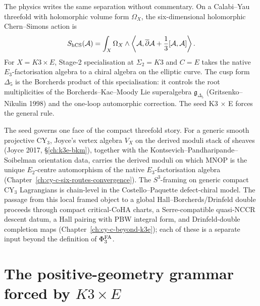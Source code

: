 The physics writes the same separation without commentary. On a
Calabi--Yau threefold with holomorphic volume form \(\Omega_X\), the
six-dimensional holomorphic Chern--Simons action is
\[
S_{\mathrm{hCS}}(\mathcal A)
=
\int_X\Omega_X\wedge
\left\langle
\mathcal A,\overline\partial\mathcal A
+\frac13[\mathcal A,\mathcal A]
\right\rangle .
\]
For \(X=K3\times E\), Stage-2 specialisation at $\Sigma_2 = K3$ and
$C = E$ takes the native \(E_3\)-factorisation algebra to a chiral
algebra on the elliptic curve. The cusp form \(\Delta_5\) is the
Borcherds product of this specialisation: it controls the root
multiplicities of the Borcherds--Kac--Moody Lie superalgebra
\(\mathfrak{g}_{\Delta_5}\) (Gritsenko--Nikulin 1998) and the
one-loop automorphic correction. The seed K3 $\times$ E forces the
general rule.

The seed governs one face of the compact threefold story. For a
generic smooth projective CY$_3$, Joyce's vertex algebra $V_X$ on the
derived moduli stack of sheaves (Joyce 2017,
\S\ref{ch:k3e-bkm}), together with the Kontsevich--Pandharipande--Soibelman
orientation data, carries the derived moduli on which MNOP is the
unique $E_2$-centre automorphism of the native $E_3$-factorisation
algebra (Chapter~\ref{ch:cy-c-six-routes-convergence}). The
$S^3$-framing on generic compact CY$_3$ Lagrangians is chain-level
in the Costello--Paquette defect-chiral model. The passage from this
local framed object to a global Hall--Borcherds/Drinfeld double
proceeds through compact critical-CoHA charts, a Serre-compatible
quasi-NCCR descent datum, a Hall pairing with PBW integral form, and
Drinfeld-double completion maps
(Chapter~\ref{ch:cy-c-beyond-k3e}); each of
these is a separate input beyond the definition of $\Phi^{\mathrm{FA}}_3$.

\section*{The positive-geometry grammar forced by
\texorpdfstring{$K3\times E$}{K3 x E}}
\label{wn:sec:platonic-preface-positive-geometry-grammar}

